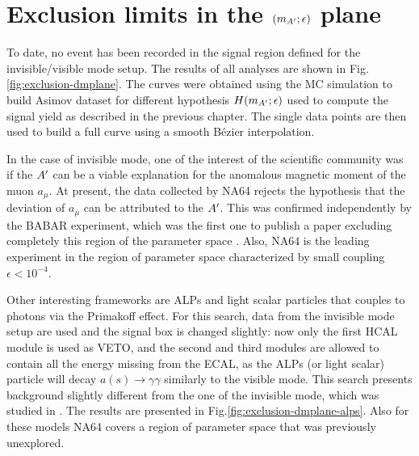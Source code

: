 \section{Exclusion limits in the $(m_{A'};\epsilon)$ plane}
\label{ch4:sec:exclusion-limits}

To date, no event has been recorded in the signal region defined for the invisible/visible mode setup. The results of all analyses are shown in Fig.\ref{fig:exclusion-dmplane}. The curves were obtained using the MC simulation to build Asimov dataset for different hypothesis $H(m_{A'};\epsilon)$ used to compute the signal yield as described in the previous chapter. The single data points are then used to build a full curve using a smooth Bézier interpolation.

In the case of invisible mode, one of the interest of the scientific community was if the $A'$ can be a viable explanation for the anomalous magnetic moment of the muon $a_{\mu}$. At present, the data collected by NA64 rejects the hypothesis that the deviation of $a_{\mu}$ can be attributed to the $A'$. This was confirmed independently by the BABAR experiment, which was the first one to publish a paper excluding completely this region of the parameter space \cite{PhysRevLett.119.131804}. Also, NA64 is the leading experiment in the region of parameter space characterized by small coupling $\epsilon < 10^{-4}$.

Other interesting frameworks are ALPs and light scalar particles that couples to photons via the Primakoff effect. For this search, data from the invisible mode setup are used and the signal box is changed slightly: now only the first HCAL module is used as VETO, and the second and third modules are allowed to contain all the energy missing from the ECAL, as the ALPs (or light scalar) particle will decay $a(s) \to \gamma \gamma$ similarly to the visible mode. This search presents background slightly different from the one of the invisible mode, which was studied in \cite{Banerjee:2020fue}. The results are presented in Fig.\ref{fig:exclusion-dmplane-alps}. Also for these models NA64 covers a region of parameter space that was previously unexplored.


